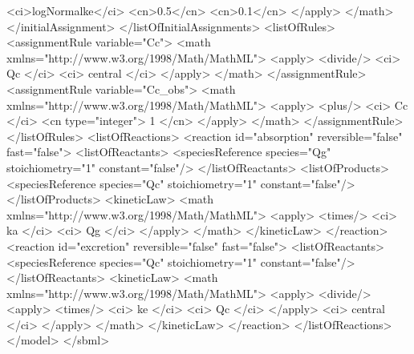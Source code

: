 \documentclass[draftspec]{sbmlpkgspec}
\begin{document}
\begin{example}
                        <ci>logNormalke</ci>
                        <cn>0.5</cn>
                        <cn>0.1</cn>
                    </apply>
                </math>
            </initialAssignment>
        </listOfInitialAssignments>
        <listOfRules>
            <assignmentRule variable="Cc">
                <math xmlns="http://www.w3.org/1998/Math/MathML">
                    <apply>
                        <divide/>
                        <ci> Qc </ci>
                        <ci> central </ci>
                    </apply>
                </math>
            </assignmentRule>
            <assignmentRule variable="Cc_obs">
                <math xmlns="http://www.w3.org/1998/Math/MathML">
                    <apply>
                        <plus/>
                        <ci> Cc </ci>
                        <cn type="integer"> 1 </cn>
                    </apply>
                </math>
            </assignmentRule>
        </listOfRules>
        <listOfReactions>
            <reaction id="absorption" reversible="false" fast="false">
                <listOfReactants>
                    <speciesReference species="Qg" stoichiometry="1" constant="false"/>
                </listOfReactants>
                <listOfProducts>
                    <speciesReference species="Qc" stoichiometry="1" constant="false"/>
                </listOfProducts>
                <kineticLaw>
                    <math xmlns="http://www.w3.org/1998/Math/MathML">
                        <apply>
                            <times/>
                            <ci> ka </ci>
                            <ci> Qg </ci>
                        </apply>
                    </math>
                </kineticLaw>
            </reaction>
            <reaction id="excretion" reversible="false" fast="false">
                <listOfReactants>
                    <speciesReference species="Qc" stoichiometry="1" constant="false"/>
                </listOfReactants>
                <kineticLaw>
                    <math xmlns="http://www.w3.org/1998/Math/MathML">
                        <apply>
                            <divide/>
                            <apply>
                                <times/>
                                <ci> ke </ci>
                                <ci> Qc </ci>
                            </apply>
                            <ci> central </ci>
                        </apply>
                    </math>
                </kineticLaw>
            </reaction>
        </listOfReactions>
    </model>
</sbml>\end{example}
\end{document}
